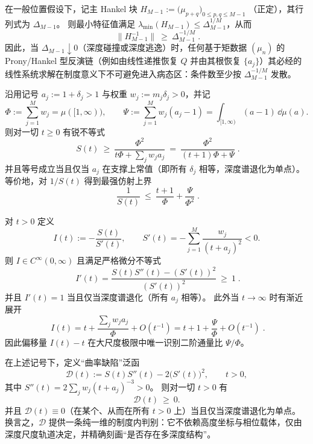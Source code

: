 \begin{proposition}
在一般位置假设下，记主 Hankel 块
\(
H_{M-1}:=\bigl(\mu_{p+q}\bigr)_{0\le p,q\le M-1}
\)
（正定），其行列式为 \(\Delta_{M-1}\)。
则最小特征值满足 \(\lambda_{\min}(H_{M-1})\le \Delta_{M-1}^{1/M}\)，从而
\[
\boxed{\;
\|H_{M-1}^{-1}\|\ \ge\ \Delta_{M-1}^{-1/M}\; }.
\]
因此，当 \(\Delta_{M-1}\downarrow 0\)（深度碰撞或深度逃逸）时，任何基于矩数据 \((\mu_n)\) 的 Prony/Hankel 型反演链（例如由线性递推恢复 \(Q\) 并由其根恢复 \(\{a_j\}\)）其必经的线性系统求解在制度意义下不可避免进入病态区：条件数至少按 \(\Delta_{M-1}^{-1/M}\) 发散。
\end{proposition}

\begin{proposition}
沿用记号 \(a_j:=1+\delta_j>1\) 与权重 \(w_j:=m_j\delta_j>0\)，并记
\[
\Phi:=\sum_{j=1}^{M}w_j=\mu([1,\infty)),
\qquad
\Psi:=\sum_{j=1}^{M}w_j(a_j-1)=\int_{[1,\infty)}(a-1)\,\dd\mu(a).
\]
则对一切 \(t\ge 0\) 有锐不等式
\[
\boxed{\;
S(t)\ \ge\ \frac{\Phi^2}{t\Phi+\sum_{j}w_j a_j}
\ =\ \frac{\Phi^2}{(t+1)\Phi+\Psi}\; }.
\]
并且等号成立当且仅当 \(a_j\) 在支撑上常值（即所有 \(\delta_j\) 相等，深度谱退化为单点）。
等价地，对 \(1/S(t)\) 得到最强仿射上界
\[
\boxed{\;
\frac{1}{S(t)}\ \le\ \frac{t+1}{\Phi}+\frac{\Psi}{\Phi^2}\; }.
\]
\end{proposition}

\begin{proposition}[有效尺度函数的超线性：\texorpdfstring{$I(t):=-S(t)/S'(t)$}{I(t)} 的单调性与极限矩识别]
对 \(t>0\) 定义
\[
I(t):=-\frac{S(t)}{S'(t)},
\qquad
S'(t)=-\sum_{j=1}^{M}\frac{w_j}{(t+a_j)^2}<0.
\]
则 \(I\in C^\infty(0,\infty)\) 且满足严格微分不等式
\[
\boxed{\;
I'(t)=\frac{S(t)S''(t)-(S'(t))^2}{(S'(t))^2}\ \ge\ 1\; }.
\]
并且 \(I'(t)=1\) 当且仅当深度谱退化（所有 \(a_j\) 相等）。
此外当 \(t\to\infty\) 时有渐近展开
\[
\boxed{\;
I(t)=t+\frac{\sum_{j}w_j a_j}{\Phi}+O(t^{-1})
=t+1+\frac{\Psi}{\Phi}+O(t^{-1})\; }.
\]
因此偏移量 \(I(t)-t\) 在大尺度极限中唯一识别二阶通量比 \(\Psi/\Phi\)。
\end{proposition}

\begin{proposition}
在上述记号下，定义“曲率缺陷”泛函
\[
\mathcal{D}(t):=S(t)S''(t)-2\bigl(S'(t)\bigr)^2,
\qquad t>0,
\]
其中
\(
S''(t)=2\sum_{j}w_j(t+a_j)^{-3}>0
\)。
则对一切 \(t>0\) 有
\[
\boxed{\;\mathcal{D}(t)\ \ge\ 0.\;}
\]
并且 \(\mathcal{D}(t)\equiv 0\)（在某个、从而在所有 \(t>0\) 上）当且仅当深度谱退化为单点。
换言之，\(\mathcal{D}\) 提供一条纯一维的制度内判别：它不依赖高度坐标与相位载体，仅由深度尺度轨道决定，并精确刻画“是否存在多深度结构”。
\end{proposition}

